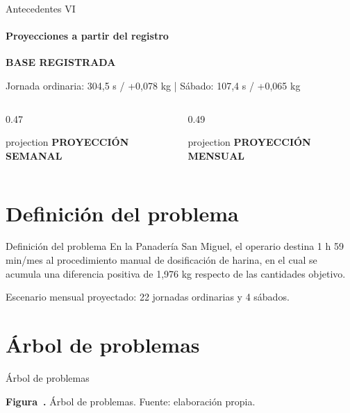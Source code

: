 \documentclass[aspectratio=169,spanish]{beamer}
\newcommand{\marcoimg}{../images/marcoref}
\newcommand{\figcap}[2]{\refstepcounter{figure}\label{#1}{\scriptsize\textbf{Figura~\thefigure.} #2}}
\begin{document}
\begin{frame}{Antecedentes VI}
\framesubtitle{Proyecciones a partir del registro}
\relax
{\small\color{Measured}\bfseries BASE REGISTRADA}
\par\smallskip
{\small Jornada ordinaria: 304,5 s / +0,078 kg \quad | \quad Sábado: 107,4 s / +0,065 kg}
\par\bigskip
\begin{columns}[T,onlytextwidth]
\begin{column}{0.47\textwidth}
\begin{beamercolorbox}[sep=0.25cm]{projection}
{\color{Projected}\bfseries PROYECCIÓN SEMANAL}
\par{}
\par{}
\par{}
\end{beamercolorbox}
\end{column}
\begin{column}{0.49\textwidth}
\begin{beamercolorbox}[sep=0.25cm]{projection}
{\color{Projected}\bfseries PROYECCIÓN MENSUAL}
\par{}
\par{}
\par{}
\end{beamercolorbox}
\end{column}
\end{columns}
\par{}
\end{frame}

\section{Definición del problema}
\begin{frame}{Definición del problema}
\relax
En la Panadería San Miguel, el operario destina 1 h 59 min/mes al
procedimiento manual de dosificación de harina, en el cual se acumula una
diferencia positiva de 1,976 kg respecto de las cantidades
objetivo.
\par\bigskip
{\footnotesize\color{Projected}Escenario mensual proyectado: 22 jornadas ordinarias y 4 sábados.}
\end{frame}

\section{Árbol de problemas}
\begin{frame}{Árbol de problemas}
\relax
\centering
\resizebox{!}{0.74\textheight}{}
\par\smallskip\figcap{fig:arbol_presentacion}{Árbol de problemas. Fuente: elaboración propia.}
\end{frame}
\end{document}
